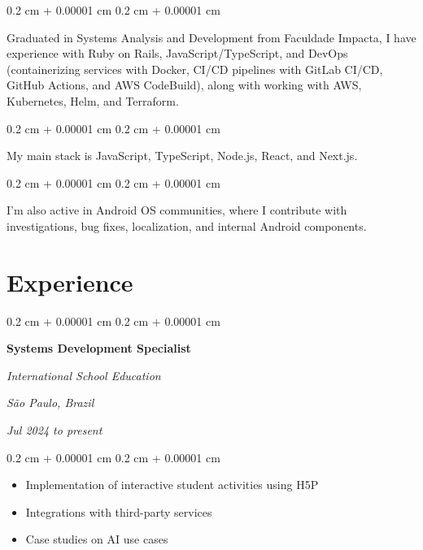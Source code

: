 \documentclass[10pt, a4paper]{article}
\newenvironment{highlights}{
    \begin{itemize}[
        topsep=0.10 cm,
        parsep=0.10 cm,
        partopsep=0pt,
        itemsep=0pt,
        leftmargin=0.4 cm + 10pt
    ]
}{
    \end{itemize}
} %
\newenvironment{onecolentry}{
    \begin{adjustwidth}{
        0.2 cm + 0.00001 cm
    }{
        0.2 cm + 0.00001 cm
    }
}{
    \end{adjustwidth}
} %
\newenvironment{twocolentry}[2][]{
    \onecolentry
    \def\secondColumn{#2}
    \setcolumnwidth{\fill, 7 cm}
    \begin{paracol}{2}
}{
    \switchcolumn \raggedleft \secondColumn
    \end{paracol}
    \endonecolentry
} %
\begin{document}
        \vspace{0.2 cm}

        \begin{onecolentry}
            Graduated in Systems Analysis and Development from Faculdade Impacta, I have experience with Ruby on Rails, JavaScript/TypeScript, and DevOps (containerizing services with Docker, CI/CD pipelines with GitLab CI/CD, GitHub Actions, and AWS CodeBuild), along with working with AWS, Kubernetes, Helm, and Terraform.
        \end{onecolentry}

        \vspace{0.2 cm}

        \begin{onecolentry}
            My main stack is JavaScript, TypeScript, Node.js, React, and Next.js.
        \end{onecolentry}

        \vspace{0.2 cm}

        \begin{onecolentry}
            I'm also active in Android OS communities, where I contribute with investigations, bug fixes, localization, and internal Android components.
        \end{onecolentry}


    
    \section{Experience}



        
        \begin{twocolentry}{
        \textit{São Paulo, Brazil}    
            
        \textit{Jul 2024 to present}}
            \textbf{Systems Development Specialist}
            
            \textit{International School Education}
        \end{twocolentry}

        \vspace{0.10 cm}
        \begin{onecolentry}
            \begin{highlights}
                \item Implementation of interactive student activities using H5P
                \item Integrations with third-party services
                \item Case studies on AI use cases
            \end{highlights}
        \end{onecolentry}
\end{document}
